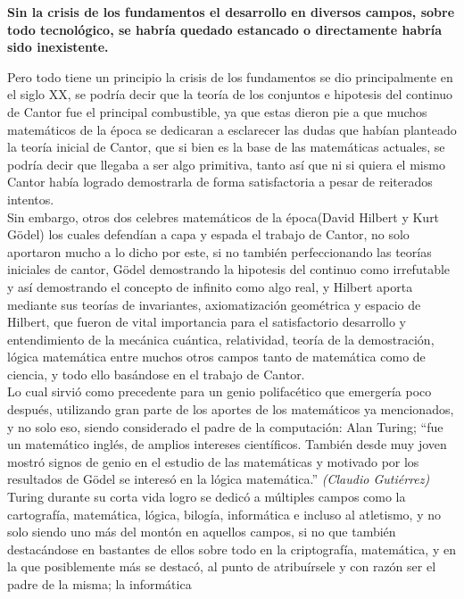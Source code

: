 \documentclass[12pt]{article}
\begin{document}
 \textbf{Sin la crisis de los fundamentos el desarrollo en diversos campos, sobre todo tecnológico, se habría quedado estancado o directamente habría sido inexistente.\\}
 
Pero todo tiene un principio la crisis de los fundamentos se dio principalmente en el siglo XX, se podría decir que la teoría de los conjuntos e hipotesis del continuo de Cantor fue el principal combustible, ya que estas dieron pie a que muchos matemáticos de la época se dedicaran a esclarecer las dudas que habían planteado la teoría inicial de Cantor, que si bien es la base de las matemáticas actuales, se podría decir que llegaba a ser algo primitiva, tanto así que ni si quiera el mismo Cantor había logrado demostrarla de forma satisfactoria a pesar de reiterados intentos.\\

Sin embargo, otros dos celebres matemáticos de la época(David Hilbert y Kurt Gödel) los cuales defendían a capa y espada el trabajo de Cantor, no solo aportaron mucho a lo dicho por este, si no también perfeccionando las teorías iniciales de cantor, Gödel  demostrando la hipotesis del continuo como irrefutable y así demostrando el concepto de infinito como algo real, y Hilbert aporta mediante sus teorías de invariantes, axiomatización geométrica y espacio de Hilbert, que fueron de vital importancia para el satisfactorio desarrollo y entendimiento de la mecánica cuántica, relatividad, teoría de la demostración, lógica matemática entre muchos otros campos tanto de matemática como de ciencia, y todo ello basándose en el trabajo de Cantor.\\


Lo cual sirvió  como precedente para un genio polifacético que emergería poco después, utilizando gran parte de los aportes de los matemáticos ya mencionados, y no solo eso, siendo considerado el padre de la computación: Alan Turing; “fue un matemático inglés, de amplios intereses científicos. También desde muy joven mostró signos de genio en el estudio de las matemáticas y motivado por los resultados de Gödel se interesó en la lógica matemática.” \emph{(Claudio Gutiérrez)}\\
Turing durante su corta vida logro se dedicó a múltiples campos como la cartografía, matemática, lógica, bilogía, informática e incluso al atletismo, y no solo siendo uno más del montón en aquellos campos, si no que también destacándose en bastantes de ellos sobre todo en la criptografía, matemática, y en la que posiblemente más se destacó, al punto de atribuírsele y con razón ser el padre de la misma; la informática\\
\end{document}
